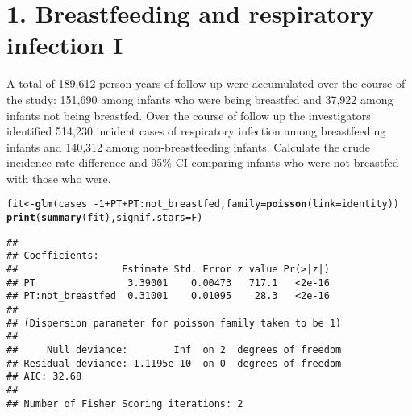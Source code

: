 \documentclass[10pt,handout]{beamer}\usepackage[]{graphicx}\usepackage[]{color}
\makeatletter
\newcommand{\hlnum}[1]{\textcolor[rgb]{0.686,0.059,0.569}{#1}}%
\newcommand{\hlopt}[1]{\textcolor[rgb]{0,0,0}{#1}}%
\newcommand{\hlstd}[1]{\textcolor[rgb]{0.345,0.345,0.345}{#1}}%
\newcommand{\hlkwb}[1]{\textcolor[rgb]{0.69,0.353,0.396}{#1}}%
\newcommand{\hlkwc}[1]{\textcolor[rgb]{0.333,0.667,0.333}{#1}}%
\newcommand{\hlkwd}[1]{\textcolor[rgb]{0.737,0.353,0.396}{\textbf{#1}}}%
\newenvironment{kframe}{%
 \def\at@end@of@kframe{}%
 \ifinner\ifhmode%
  \def\at@end@of@kframe{\end{minipage}}%
  \begin{minipage}{\columnwidth}%
 \fi\fi%
 \def\FrameCommand##1{\hskip\@totalleftmargin \hskip-\fboxsep
 \colorbox{shadecolor}{##1}\hskip-\fboxsep
     \hskip-\linewidth \hskip-\@totalleftmargin \hskip\columnwidth}%
 \MakeFramed {\advance\hsize-\width
   \@totalleftmargin\z@ \linewidth\hsize
   \@setminipage}}%
 {\par\unskip\endMakeFramed%
 \at@end@of@kframe}
\newenvironment{knitrout}{}{} %
\makeatother
\begin{document}
\section{1. Breastfeeding and respiratory infection I}
\begin{frame}
\vspace*{-.91in}
\tiny
A total of 189,612 person-years of follow up were accumulated over the course of the study: 151,690
among infants who were being breastfed and 37,922 among infants not being breastfed. Over the
course of follow up the investigators identified 514,230 incident cases of respiratory infection among
breastfeeding infants and 140,312 among non-breastfeeding infants. Calculate the crude incidence rate difference and 95\% CI comparing infants who were not breastfed with those who were.
\begin{knitrout}\tiny
{}\color{fgcolor}\begin{kframe}
\begin{alltt}
\hlstd{fit} \hlkwb{<-} \hlkwd{glm}\hlstd{(cases} \hlopt{~ -}\hlnum{1} \hlopt{+} \hlstd{PT} \hlopt{+} \hlstd{PT}\hlopt{:}\hlstd{not_breastfed,} \hlkwc{family} \hlstd{=} \hlkwd{poisson}\hlstd{(}\hlkwc{link} \hlstd{= identity))}
\hlkwd{print}\hlstd{(}\hlkwd{summary}\hlstd{(fit),} \hlkwc{signif.stars} \hlstd{= F)}
\end{alltt}
\begin{verbatim}
## 
## Coefficients:
##                  Estimate Std. Error z value Pr(>|z|)
## PT                3.39001    0.00473   717.1   <2e-16
## PT:not_breastfed  0.31001    0.01095    28.3   <2e-16
## 
## (Dispersion parameter for poisson family taken to be 1)
## 
##     Null deviance:        Inf  on 2  degrees of freedom
## Residual deviance: 1.1195e-10  on 0  degrees of freedom
## AIC: 32.68
## 
## Number of Fisher Scoring iterations: 2
\end{verbatim}
\end{kframe}
\end{knitrout}

\end{frame}
\end{document}
